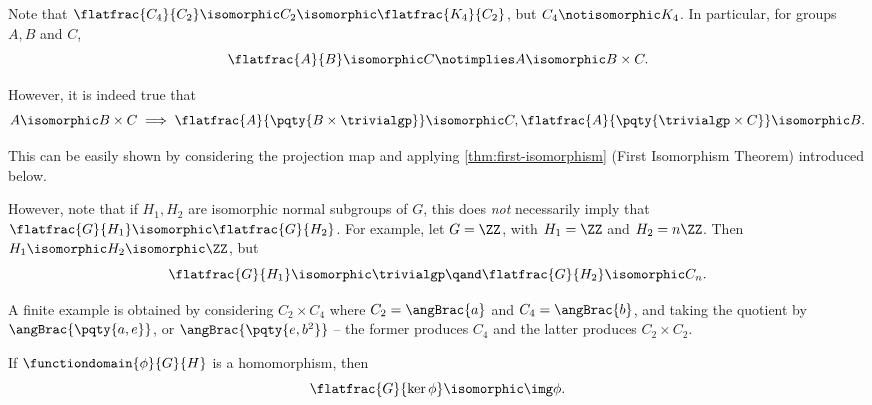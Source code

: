 \begin{remark}
    Note that \(\flatfrac{C_4}{C_2} \isomorphic C_2 \isomorphic \flatfrac{K_4}{C_2}\), but \(C_4 \notisomorphic K_4\). In particular, for groups \(A, B\) and \(C\),
    \[
        \flatfrac{A}{B} \isomorphic C \notimplies A \isomorphic B \times C.
    \]

    However, it is indeed true that
    \[
        A \isomorphic B \times C \implies \flatfrac{A}{\pqty{B \times \trivialgp}} \isomorphic C, \flatfrac{A}{\pqty{\trivialgp \times C}} \isomorphic B.
    \]

    This can be easily shown by considering the projection map and applying \autoref{thm:first-isomorphism} (First Isomorphism Theorem) introduced below.

    However, note that if \(H_1, H_2\) are isomorphic normal subgroups of \(G\), this does \emph{not} necessarily imply that \(\flatfrac{G}{H_1} \isomorphic \flatfrac{G}{H_2}\). For example, let \(G = \ZZ\), with \(H_1 = \ZZ\) and \(H_2 = n\ZZ\). Then \(H_1 \isomorphic H_2 \isomorphic \ZZ\), but
    \[
        \flatfrac{G}{H_1} \isomorphic \trivialgp
        \qand
        \flatfrac{G}{H_2} \isomorphic C_n.
    \]

    A finite example is obtained by considering \(C_2 \times C_4\) where \(C_2 = \angBrac{a}\) and \(C_4 = \angBrac{b}\), and taking the quotient by \(\angBrac{\pqty{a, e}}\), or \(\angBrac{\pqty{e, b^2}}\) -- the former produces \(C_4\) and the latter produces \(C_2 \times C_2\).
\end{remark}
    
\begin{theorem}
    \label{thm:first-isomorphism}%
    If \(\functiondomain{\phi}{G}{H}\) is a homomorphism, then
    \[
        \flatfrac{G}{\ker \phi} \isomorphic \img \phi.
    \]
\end{theorem}

